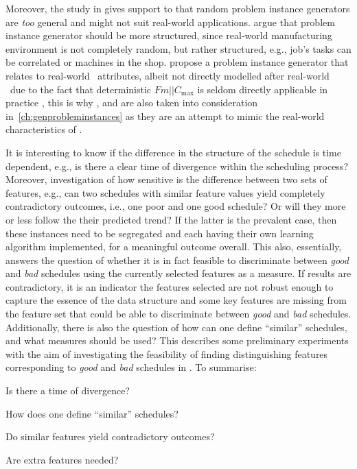 Moreover, the study in \citet{InRu12} gives support to that random problem instance generators are \emph{too} general and might not suit real-world applications. \citet{Whitley} argue that problem instance generator should be more structured, since real-world manufacturing environment is not completely random, but rather structured, e.g.,  job's tasks can be correlated or machines in the shop. \citeauthor{Whitley} propose a problem instance generator that relates to real-world \fsp\ attributes, albeit not directly modelled after real-world \fsp\ due to the fact that deterministic $Fm||C_{\max}$ is seldom directly applicable in practice \citep{Dudek92}, this is why ,  and  are also taken into consideration in~\cref{ch:genprobleminstances} as they are an attempt to mimic the real-world characteristics of \fsp.

It is interesting to know if the difference in the structure of the schedule is time dependent, e.g.,  is there a clear time of divergence within the scheduling process? 
Moreover, investigation of how sensitive is the difference between two sets of features, e.g.,  can two schedules with similar feature values yield completely contradictory outcomes, i.e., one poor and one good schedule? Or will they more or less follow the their predicted trend? If the latter is the prevalent case, then these instances need to be segregated and each having their own learning algorithm implemented, for a meaningful outcome overall.  
This also, essentially, answers the question of whether  it is in fact feasible to discriminate between \emph{good} and \emph{bad} schedules using the currently selected features as a measure. If results are contradictory, it is an indicator the features selected are not robust enough to capture the essence of the data structure and some key features are missing from the feature set that could be able to discriminate between \emph{good} and \emph{bad} schedules. 
Additionally, there is also the question of how can one define ``similar'' schedules, and what measures should be used? This  describes some preliminary experiments with the aim of investigating the feasibility of finding distinguishing features corresponding to \emph{good} and \emph{bad} schedules in \jsp. To summarise:
\begin{inparaenum}[(a)]
\item Is there a time of divergence?
\item How does one define ``similar'' schedules?
\item Do similar features yield contradictory outcomes?
\item Are extra features needed?
\end{inparaenum}

